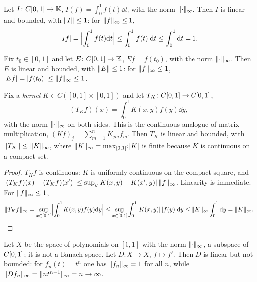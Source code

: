 \begin{example}\label{ex:integral-functional}
Let $I \colon C[0,1] \to \mathbb{K}$, $I(f) = \int_0^1 f(t) \dd t$, with the
norm $\lVert\cdot\rVert_\infty$. Then $I$ is linear and bounded, with
$\lVert I\rVert \le 1$: for $\lVert f\rVert_\infty \le 1$,
\[
  \lvert I f\rvert = \Bigl\lvert \int_0^1 f(t) \mathrm{d} t \Bigr\rvert
  \le \int_0^1 \lvert f(t)\rvert \mathrm{d} t \le \int_0^1 \mathrm{d} t = 1 .
\]
\end{example}

\begin{example}\label{ex:evaluation}
Fix $t_0 \in [0,1]$ and let $E \colon C[0,1] \to \mathbb{K}$, $E f = f(t_0)$,
with the norm $\lVert\cdot\rVert_\infty$. Then $E$ is linear and bounded, with
$\lVert E\rVert \le 1$: for $\lVert f\rVert_\infty \le 1$,
$\lvert E f\rvert = \lvert f(t_0)\rvert \le \lVert f\rVert_\infty \le 1$.
\end{example}

\begin{example}\label{ex:integral-kernel}
Fix a \emph{kernel} $K \in C([0,1] \times [0,1])$ and let
$T_K \colon C[0,1] \to C[0,1]$,
\[
  (T_K f)(x) = \int_0^1 K(x,y) f(y) \dd y ,
\]
with the norm $\lVert\cdot\rVert_\infty$ on both sides. This is the continuous
analogue of matrix multiplication, $(Kf)_j = \sum_{m=1}^{n} K_{jm} f_m$.
Then $T_K$ is linear and bounded, with $\lVert T_K\rVert \le \lVert K\rVert_\infty$,
where $\lVert K\rVert_\infty = \max_{[0,1]^2} \lvert K\rvert$ is finite because $K$ is
continuous on a compact set.
\end{example}

\begin{proof}
$T_K f$ is continuous: $K$ is uniformly continuous on the compact square, and
$\lvert(T_K f)(x) - (T_K f)(x')\rvert
\le \sup_{y} \lvert K(x,y) - K(x',y)\rvert\,\lVert f\rVert_\infty$. Linearity is
immediate. For $\lVert f\rVert_\infty \le 1$,
\[
  \lVert T_K f\rVert_\infty
  = \sup_{x \in [0,1]} \Bigl\lvert \int_0^1 K(x,y) f(y) \mathrm{d} y \Bigr\rvert
  \le \sup_{x \in [0,1]} \int_0^1 \lvert K(x,y)\rvert\,\lvert f(y)\rvert \mathrm{d} y
  \le \lVert K\rVert_\infty \int_0^1 \mathrm{d} y = \lVert K\rVert_\infty . \qedhere
\]
\end{proof}

\begin{example}[Differentiation]\label{ex:differentiation}
Let $X$ be the space of polynomials on $[0,1]$ with the norm
$\lVert\cdot\rVert_\infty$, a subspace of $C[0,1]$; it is not a Banach space.
Let $D \colon X \to X$, $f \mapsto f'$. Then $D$ is linear but not bounded:
for $f_n(t) = t^n$ one has $\lVert f_n\rVert_\infty = 1$ for all $n$, while
$\lVert D f_n\rVert_\infty = \lVert n t^{n-1}\rVert_\infty = n \to \infty$.
\end{example}

